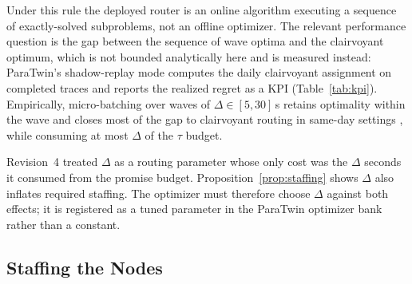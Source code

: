 Under this rule the deployed router is an online algorithm executing a sequence of exactly-solved subproblems, not an offline optimizer. The relevant performance question is the gap between the sequence of wave optima and the clairvoyant optimum, which is not bounded analytically here and is measured instead: ParaTwin's shadow-replay mode computes the daily clairvoyant assignment on completed traces and reports the realized regret as a KPI (Table~\ref{tab:kpi}). Empirically, micro-batching over waves of $\Delta\in[5,30]$\,s retains optimality within the wave and closes most of the gap to clairvoyant routing in same-day settings \cite{klapp2018,ulmer2021}, while consuming at most $\Delta$ of the $\tau$ budget.

\begin{remark}
Revision~4 treated $\Delta$ as a routing parameter whose only cost was the $\Delta$ seconds it consumed from the promise budget. Proposition~\ref{prop:staffing} shows $\Delta$ also inflates required staffing. The optimizer must therefore choose $\Delta$ against both effects; it is registered as a tuned parameter in the ParaTwin optimizer bank rather than a constant.
\end{remark}

\subsection{Staffing the Nodes}

